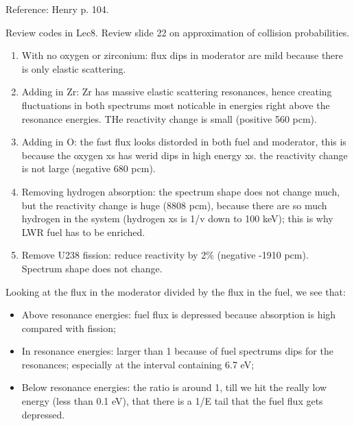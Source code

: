 \documentclass{school-22.211-notes}
\date{March  7, 2012}
\begin{document}
\maketitle




Reference: Henry p. 104. 

Review codes in Lec8. Review slide 22 on approximation of collision probabilities. 

\begin{enumerate}
\item With no oxygen or zirconium: flux dips in moderator are mild because there is only elastic scattering. 
\item Adding in Zr: Zr has massive elastic scattering resonances, hence creating fluctuations in both spectrums most noticable in energies right above the resonance energies. THe reactivity change is small (positive 560 pcm).
\item Adding in O: the fast flux looks distorded in both fuel and moderator, this is because the oxygen xs has werid dips in high energy xs. the reactivity change is not large (negative 680 pcm). 
\item Removing hydrogen absorption: the spectrum shape does not change much, but the reactivity change is huge (8808 pcm), because there are so much hydrogen in the system (hydrogen xs is 1/v down to 100 keV); this is why LWR fuel has to be enriched. 
\item Remove U238 fission: reduce reactivity by 2\% (negative -1910 pcm). Spectrum shape does not change. 
\end{enumerate}
Looking at the flux in the moderator divided by the flux in the fuel, we see that:
\begin{itemize}
\item Above resonance energies: fuel flux is depressed because absorption is high compared with fission; 
\item In resonance energies: larger than 1 because of fuel spectrums dips for the resonances; especially at the interval containing 6.7 eV;
\item Below resonance energies: the ratio is around 1, till we hit the really low energy (less than 0.1 eV), that there is a 1/E tail that the fuel flux gets depressed. 
\end{itemize}
\end{document}
